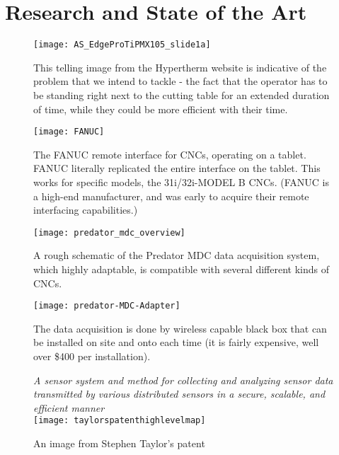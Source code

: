 \documentclass[12pt,letterpaper,titlepage]{article}
\begin{document}
\newpage
\section{Research and State of the Art} \label{ResearchandStateoftheArt}
\begin{center}
\begin{figure}[h]
\begin{center}
\texttt{[image: AS\_EdgeProTiPMX105\_slide1a]}
\caption{This telling image from the Hypertherm website is indicative of the problem that we intend to tackle - the fact that the operator has to be standing right next to the cutting table for an extended duration of time, while they could be more efficient with their time.}
\end{center}
\end{figure}
\begin{figure}[h]
\begin{center}
\texttt{[image: FANUC]}
\caption{The FANUC remote interface for CNCs, operating on a tablet. FANUC literally replicated the entire interface on the tablet. This works for specific models, the 31i/32i-MODEL B CNCs.
(FANUC is a high-end manufacturer, and was early to acquire their remote interfacing capabilities.)}
\end{center}
\end{figure}
\newpage
\begin{figure}[h]
\begin{center}
\texttt{[image: predator\_mdc\_overview]}
\caption{A rough schematic of the Predator MDC data acquisition system, which highly adaptable, is compatible with several different kinds of CNCs.}
\end{center}
\end{figure}
\begin{figure}[h!]
\begin{center}
\texttt{[image: predator-MDC-Adapter]}
\caption{The data acquisition is done by wireless capable black box that can be installed on site and onto each time (it is fairly expensive, well over \$400 per installation).}
\end{center}
\end{figure}
\newpage
\begin{figure}[h]
\begin{center}

\emph{A sensor system and method for collecting and analyzing sensor data transmitted by various distributed sensors in a secure, scalable, and efficient manner}\\
\vspace{.5in}
\texttt{[image: taylorspatenthighlevelmap]}
\caption{An image from Stephen Taylor's patent}


\end{center}
\end{figure}
\end{center}
\end{document}
